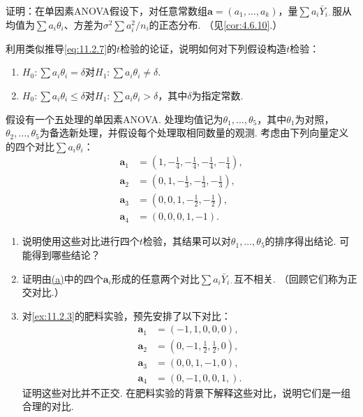 \begin{exercise}\label{exercise:11.8}
证明：在单因素ANOVA假设下，对任意常数组$\boldsymbol a=(a_1,\ldots,a_k)$，量$\sum a_i\bar Y_{i\cdot}$服从均值为$\sum a_i\theta_i$、方差为$\sigma^2\sum a_i^2/n_i$的正态分布. （见\autoref{cor:4.6.10}.）
\end{exercise}

\begin{exercise}\label{exercise:11.9}
利用类似推导\eqref{eq:11.2.7}的$t$检验的论证，说明如何对下列假设构造$t$检验：
\begin{enumerate}[label=(\alph*)]
\item\label{item:11.9.a} $H_0:\sum a_i\theta_i=\delta$对$H_1:\sum a_i\theta_i\ne\delta$.
\item\label{item:11.9.b} $H_0:\sum a_i\theta_i\le\delta$对$H_1:\sum a_i\theta_i>\delta$，其中$\delta$为指定常数.
\end{enumerate}
\end{exercise}

\begin{exercise}\label{exercise:11.10}
假设有一个五处理的单因素ANOVA. 处理均值记为$\theta_1,\ldots,\theta_5$，其中$\theta_1$为对照，$\theta_2,\ldots,\theta_5$为备选新处理，并假设每个处理取相同数量的观测. 考虑由下列向量定义的四个对比$\sum a_i\theta_i$：
$$\begin{aligned}
\boldsymbol a_1&=(1,-\tfrac14,-\tfrac14,-\tfrac14,-\tfrac14),\\
\boldsymbol a_2&=(0,1,-\tfrac13,-\tfrac13,-\tfrac13),\\
\boldsymbol a_3&=(0,0,1,-\tfrac12,-\tfrac12),\\
\boldsymbol a_4&=(0,0,0,1,-1).
\end{aligned}$$
\begin{enumerate}[label=(\alph*)]
\item\label{item:11.10.a} 说明使用这些对比进行四个$t$检验，其结果可以对$\theta_1,\ldots,\theta_5$的排序得出结论. 可能得到哪些结论？
\item\label{item:11.10.b} 证明由\hyperref[item:11.10.a]{(a)}中的四个$\boldsymbol a_i$形成的任意两个对比$\sum a_i\bar Y_{i\cdot}$互不相关. （回顾它们称为正交对比.）
\item\label{item:11.10.c} 对\autoref{ex:11.2.3}的肥料实验，预先安排了以下对比：
$$\begin{aligned}
\boldsymbol a_1&=(-1,1,0,0,0),\\
\boldsymbol a_2&=(0,-1,\tfrac12,\tfrac12,0),\\
\boldsymbol a_3&=(0,0,1,-1,0),\\
\boldsymbol a_4&=(0,-1,0,0,1,).
\end{aligned}$$
证明这些对比并不正交. 在肥料实验的背景下解释这些对比，说明它们是一组合理的对比.
\end{enumerate}
\end{exercise}

